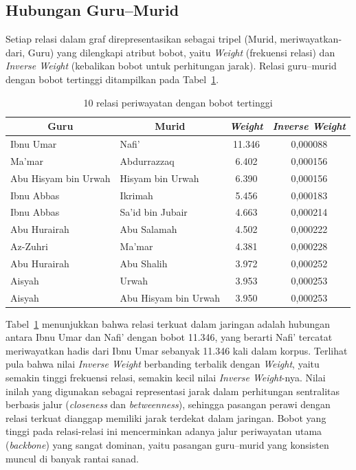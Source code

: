 \subsection{Hubungan Guru--Murid}
Setiap relasi dalam graf direpresentasikan sebagai tripel (Murid, meriwayatkan-dari, Guru) yang dilengkapi atribut bobot, yaitu \textit{Weight} (frekuensi relasi) dan \textit{Inverse Weight} (kebalikan bobot untuk perhitungan jarak). Relasi guru--murid dengan bobot tertinggi ditampilkan pada Tabel~\ref{tab:relasi-terkuat}.

\begin{table}[H]
\centering
\caption{10 relasi periwayatan dengan bobot tertinggi}
\label{tab:relasi-terkuat}
\renewcommand{\arraystretch}{1.3}
\begin{tabular}{|l|l|c|c|}
\hline
\multicolumn{1}{|c|}{\textbf{Guru}} & \multicolumn{1}{c|}{\textbf{Murid}} & \multicolumn{1}{c|}{\textbf{\textit{Weight}}} & \multicolumn{1}{c|}{\textbf{\textit{Inverse Weight}}} \\
\hline
Ibnu Umar & Nafi' & 11.346 & 0,000088 \\
\hline
Ma'mar & Abdurrazzaq & 6.402 & 0,000156 \\
\hline
Abu Hisyam bin Urwah & Hisyam bin Urwah & 6.390 & 0,000156 \\
\hline
Ibnu Abbas & Ikrimah & 5.456 & 0,000183 \\
\hline
Ibnu Abbas & Sa'id bin Jubair & 4.663 & 0,000214 \\
\hline
Abu Hurairah & Abu Salamah & 4.502 & 0,000222 \\
\hline
Az-Zuhri & Ma'mar & 4.381 & 0,000228 \\
\hline
Abu Hurairah & Abu Shalih & 3.972 & 0,000252 \\
\hline
Aisyah & Urwah & 3.953 & 0,000253 \\
\hline
Aisyah & Abu Hisyam bin Urwah & 3.950 & 0,000253 \\
\hline
\end{tabular}
\end{table}

Tabel~\ref{tab:relasi-terkuat} menunjukkan bahwa relasi terkuat dalam jaringan adalah hubungan antara Ibnu Umar dan Nafi' dengan bobot 11.346, yang berarti Nafi' tercatat meriwayatkan hadis dari Ibnu Umar sebanyak 11.346 kali dalam korpus. Terlihat pula bahwa nilai \textit{Inverse Weight} berbanding terbalik dengan \textit{Weight}, yaitu semakin tinggi frekuensi relasi, semakin kecil nilai \textit{Inverse Weight}-nya. Nilai inilah yang digunakan sebagai representasi jarak dalam perhitungan sentralitas berbasis jalur (\textit{closeness} dan \textit{betweenness}), sehingga pasangan perawi dengan relasi terkuat dianggap memiliki jarak terdekat dalam jaringan. Bobot yang tinggi pada relasi-relasi ini mencerminkan adanya jalur periwayatan utama (\textit{backbone}) yang sangat dominan, yaitu pasangan guru--murid yang konsisten muncul di banyak rantai sanad.

